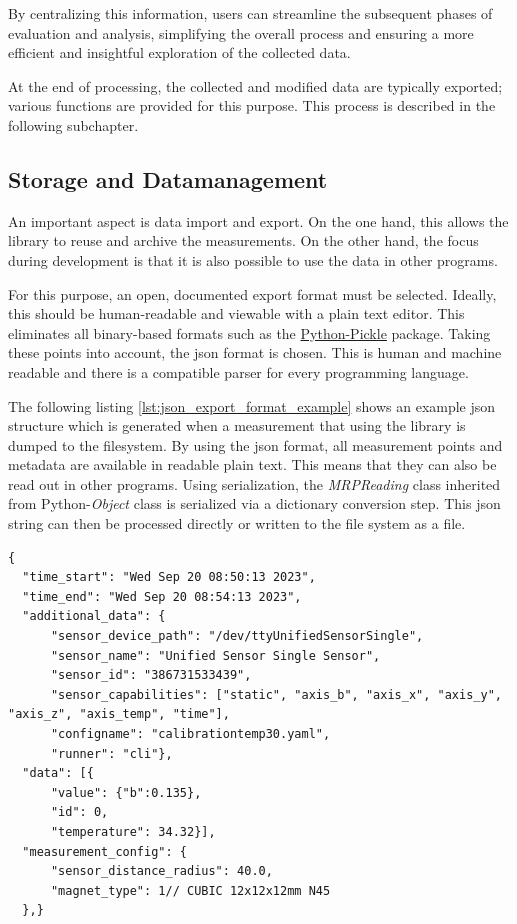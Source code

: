 By centralizing this information, users can streamline the subsequent
phases of evaluation and analysis, simplifying the overall process and
ensuring a more efficient and insightful exploration of the collected
data.

At the end of processing, the collected and modified data are typically
exported; various functions are provided for this purpose. This process
is described in the following subchapter.

\hypertarget{storage-and-datamanagement}{%
\subsection{Storage and
Datamanagement}\label{storage-and-datamanagement}}

An important aspect is data import and export. On the one hand, this
allows the library to reuse and archive the measurements. On the other
hand, the focus during development is that it is also possible to use
the data in other programs.

For this purpose, an open, documented export format must be selected.
Ideally, this should be human-readable and viewable with a plain text
editor. This eliminates all binary-based formats such as the
\href{https://docs.python.org/3/library/pickle.html}{Python-Pickle}
package. Taking these points into account, the \gls{json} format is
chosen. This is human and machine readable and there is a compatible
parser for every programming language.

The following listing \ref{lst:json_export_format_example} shows an
example \gls{json} structure which is generated when a measurement that
using the library is dumped to the filesystem. By using the \gls{json}
format, all measurement points and metadata are available in readable
plain text. This means that they can also be read out in other programs.
Using serialization, the \emph{MRPReading} class inherited from
Python-\emph{Object} class is serialized via a dictionary conversion
step. This \gls{json} string can then be processed directly or written
to the file system as a file.

\begin{lstlisting}[caption={JSON structure of an exported MRPReading based measurement with information about the measurement environment, additional meta-data and raw data value objects}, label=lst:json_export_format_example]
{
  "time_start": "Wed Sep 20 08:50:13 2023",
  "time_end": "Wed Sep 20 08:54:13 2023",
  "additional_data": {
      "sensor_device_path": "/dev/ttyUnifiedSensorSingle",
      "sensor_name": "Unified Sensor Single Sensor",
      "sensor_id": "386731533439",
      "sensor_capabilities": ["static", "axis_b", "axis_x", "axis_y", "axis_z", "axis_temp", "time"],
      "configname": "calibrationtemp30.yaml",
      "runner": "cli"},
  "data": [{
      "value": {"b":0.135},
      "id": 0,
      "temperature": 34.32}],
  "measurement_config": {
      "sensor_distance_radius": 40.0,
      "magnet_type": 1// CUBIC 12x12x12mm N45
  },}
\end{lstlisting}

